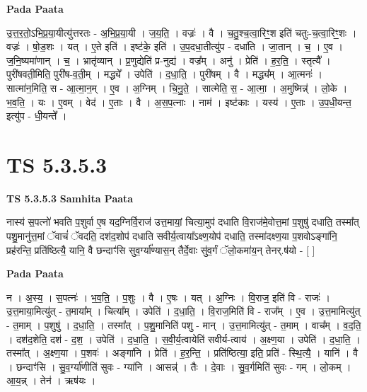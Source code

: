\documentclass[17pt]{extarticle}
\begin{document}
\textbf{Pada Paata} \newline

उ॒त्त॒र॒तो॒ऽभि॒प्र॒या॒यीत्यु॑त्तरतः - अ॒भि॒प्र॒या॒यी । ज॒य॒ति॒ । वज्रः॑ । वै । च॒तु॒श्च॒त्वा॒रिꣳ॒॒श इति॑ चतुः-च॒त्वा॒रिꣳ॒॒शः । वज्रः॑ । षो॒ड॒शः । यत् । ए॒ते इति॑ । इष्ट॑के॒ इति॑ । उ॒प॒दधा॒तीत्यु॑प - दधा॑ति । जा॒तान् । च॒ । ए॒व । ज॒नि॒ष्यमा॑णान् । च॒ । भ्रातृ॑व्यान् । प्र॒णुद्येति॑ प्र-नुद्य॑ । वज्र᳚म् । अनु॑ । प्रेति॑ । ह॒र॒ति॒ । स्तृत्यै᳚ । पुरी॑षवती॒मिति॒ पुरी॑ष-व॒ती॒म् । मद्ध्ये᳚ । उपेति॑ । द॒धा॒ति॒ । पुरी॑षम् । वै । मद्ध्य᳚म् । आ॒त्मनः॑ । सात्मा॑न॒मिति॒ स - आ॒त्मा॒न॒म् । ए॒व । अ॒ग्निम् । चि॒नु॒ते॒ । सात्मेति॒ स॒ - आ॒त्मा॒ । अ॒मुष्मिन्न्॑ । लो॒के । भ॒व॒ति॒ । यः । ए॒वम् । वेद॑ । ए॒ताः । वै । अ॒स॒प॒त्नाः । नाम॑ । इष्ट॑काः । यस्य॑ । ए॒ताः । उ॒प॒धी॒यन्त॒ इत्यु॑प - धी॒यन्ते᳚ ।  \newline





\section{ TS 5.3.5.3 }

\textbf{TS 5.3.5.3 } \newline
\textbf{Samhita Paata} \newline

नास्य॑ स॒पत्नो॑ भवति प॒शुर्वा ए॒ष यद॒ग्निर्वि॒राज॑ उत्त॒मायां॒ चित्या॒मुप॑ दधाति वि॒राज॑मे॒वोत्त॒मां प॒शुषु॑ दधाति॒ तस्मा᳚त् पशु॒मानु॑त्त॒मां ॅवाचं॑ ॅवदति॒ दश॑द॒शोप॑ दधाति सवीर्य॒त्वाया᳚ऽक्ष्ण॒योप॑ दधाति॒ तस्मा॑दक्ष्ण॒या प॒शवोऽङ्गा॑नि॒ प्रह॑रन्ति॒ प्रति॑ष्ठित्यै॒ यानि॒ वै छन्दाꣳ॑सि सुव॒र्ग्या᳚ण्यास॒न् तैर्दे॒वाः सु॑व॒र्गं ॅलो॒कमा॑य॒न् तेनर्.ष॑यो - [  ] \newline

\textbf{Pada Paata} \newline

न । अ॒स्य॒ । स॒पत्नः॑ । भ॒व॒ति॒ । प॒शुः । वै । ए॒षः । यत् । अ॒ग्निः । वि॒राज॒ इति॑ वि - राजः॑ । उ॒त्त॒माया॒मित्यु॑त् - त॒माया᳚म् । चित्या᳚म् । उपेति॑ । द॒धा॒ति॒ । वि॒राज॒मिति॑ वि - राज᳚म् । ए॒व । उ॒त्त॒मामित्यु॑त् - त॒माम् । प॒शुषु॑ । द॒धा॒ति॒ । तस्मा᳚त् । प॒शु॒मानिति॑ पशु - मान् । उ॒त्त॒मामित्यु॑त् - त॒माम् । वाच᳚म् । व॒द॒ति॒ । दश॑द॒शेति॒ दश॑ - द॒श॒ । उपेति॑ । द॒धा॒ति॒ । स॒वी॒र्य॒त्वायेति॑ सवीर्य-त्वाय॑ । अ॒क्ष्ण॒या । उपेति॑ । द॒धा॒ति॒ । तस्मा᳚त् । अ॒क्ष्ण॒या । प॒शवः॑ । अङ्गा॑नि । प्रेति॑ । ह॒र॒न्ति॒ । प्रति॑ष्ठित्या॒ इति॒ प्रति॑ - स्थि॒त्यै॒ । यानि॑ । वै । छन्दाꣳ॑सि । सु॒व॒र्ग्या॑णीति॑ सुवः - ग्या॑नि । आसन्न्॑ । तैः । दे॒वाः । सु॒व॒र्गमिति॑ सुवः - गम् । लो॒कम् । आ॒य॒न्न् । तेन॑ । ऋष॑यः ।  \newline
\end{document}
